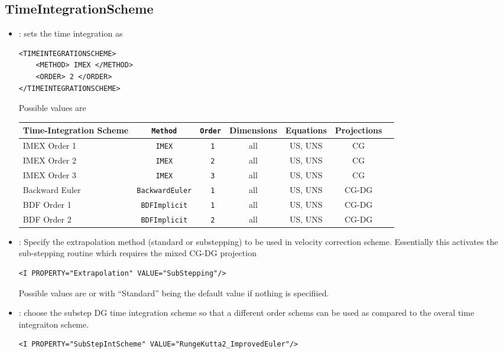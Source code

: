 \subsection{TimeIntegrationScheme}
\begin{itemize}
\item {}:  sets the time integration as
\begin{lstlisting}[style=XMLStyle]
<TIMEINTEGRATIONSCHEME>
    <METHOD> IMEX </METHOD>
    <ORDER> 2 </ORDER>
</TIMEINTEGRATIONSCHEME>
\end{lstlisting}

Possible values are
\begin{center}
\footnotesize
\begin{tabular}{lcccccc}
\toprule
{Time-Integration Scheme} & \texttt{Method} & \texttt{Order} &{Dimensions}&{Equations}&Projections\\
\midrule
IMEX Order 1 & \texttt{IMEX} & \texttt{ 1} & all & US, UNS & CG \\
IMEX Order 2 & \texttt{IMEX} & \texttt{ 2} & all & US, UNS & CG \\
IMEX Order 3 & \texttt{IMEX} & \texttt{ 3} & all & US, UNS & CG \\
Backward Euler & \texttt{BackwardEuler} & \texttt{ 1} & all & US, UNS & CG-DG \\
BDF Order 1 & \texttt{BDFImplicit} & \texttt{ 1} & all & US, UNS & CG-DG \\
BDF Order 2 & \texttt{BDFImplicit} & \texttt{ 2} & all & US, UNS & CG-DG \\
\bottomrule
\end{tabular}
\end{center}

\item {}: Specify the extrapolation method
  (standard or substepping) to be used in velocity correction
  scheme. Essentially this activates the sub-stepping routine which
  requires the mixed CG-DG projection
  
\begin{lstlisting}[style=XMLStyle]
<I PROPERTY="Extrapolation" VALUE="SubStepping"/>
\end{lstlisting}

Possible values are  or  with ``Standard'' being the default value if nothing is specifiied. 

\item {}: choose the substep DG time integration
  scheme so that a different order schems can be used as compared to
  the overal time integraiton scheme.
\begin{lstlisting}[style=XMLStyle]
<I PROPERTY="SubStepIntScheme" VALUE="RungeKutta2_ImprovedEuler"/>
\end{lstlisting}


\end{itemize}
